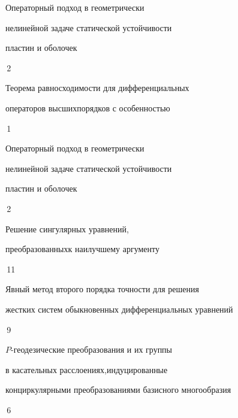 {Операторный подход в геометрически\newline


нелинейной задаче статической устойчивости


пластин и оболочек}{\No\,2}




{Теорема равносходимости для дифференциальных  


операторов высших\newline порядков с особенностью}{\No\,1}




{Операторный подход в геометрически\newline


нелинейной задаче статической устойчивости


пластин и оболочек}{\No\,2}




{Решение сингулярных уравнений, 


преобразованных\newline к наилучшему аргументу}{\No\,11}








{Явный метод второго порядка точности для решения\newline


жестких систем обыкновенных дифференциальных уравнений}{\No\,9}




{$P$-геодезические преобразования и их группы


в касательных расслоениях,\newline индуцированные 


конциркулярными преобразованиями базисного многообразия}{\No\,6}




